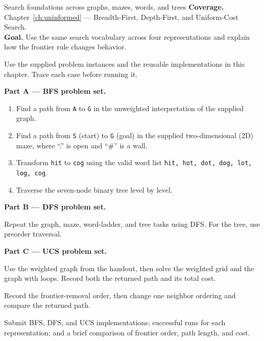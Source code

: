 
\begin{labproject}{Search foundations across graphs, mazes, words, and trees}
\textbf{Coverage.} Chapter~\ref{ch:uninformed} --- Breadth-First, Depth-First, and Uniform-Cost Search.\\
\textbf{Goal.} Use the same search vocabulary across four representations and explain how the frontier rule changes behavior.

\begin{labmode}
Use the supplied problem instances and the reusable implementations in this chapter. Trace each case before running it.
\end{labmode}

\medskip\noindent\textbf{Part A --- BFS problem set.}\par
\begin{enumerate}
  \item Find a path from \texttt{A} to \texttt{G} in the unweighted interpretation of the supplied graph.
  \item Find a path from \texttt{S} (start) to \texttt{G} (goal) in the supplied two-dimensional (2D) maze, where ``.'' is open and ``\#'' is a wall.
  \item Transform \texttt{hit} to \texttt{cog} using the valid word list \texttt{hit, hot, dot, dog, lot, log, cog}.
  \item Traverse the seven-node binary tree level by level.
\end{enumerate}

\medskip\noindent\textbf{Part B --- DFS problem set.}\par
Repeat the graph, maze, word-ladder, and tree tasks using DFS. For the tree, use preorder traversal.

\medskip\noindent\textbf{Part C --- UCS problem set.}\par
Use the weighted graph from the handout, then solve the weighted grid and the graph with loops. Record both the returned path and its total cost.

\begin{tryit}
Record the frontier-removal order, then change one neighbor ordering and compare the returned path.
\end{tryit}
\end{labproject}

\begin{labdeliverable}
Submit BFS, DFS, and UCS implementations; successful runs for each representation; and a brief comparison of frontier order, path length, and cost.
\end{labdeliverable}
